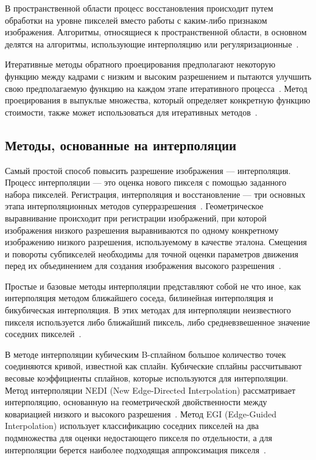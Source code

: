 \documentclass{bmstu}
\begin{document}
В пространственной области процесс восстановления происходит путем обработки на уровне пикселей вместо работы с каким-либо признаком изображения. 
Алгоритмы, относящиеся к пространственной области, в основном делятся на алгоритмы, использующие интерполяцию или регуляризационные~\cite{Daithankar2021}.

Итеративные методы обратного проецирования предполагают некоторую функцию между кадрами с низким и высоким разрешением и пытаются улучшить свою предполагаемую функцию на каждом этапе итеративного процесса~\cite{Cohen2000}. 
Метод проецирования в выпуклые множества, который определяет конкретную функцию стоимости, также может использоваться для итеративных методов~\cite{Katsaggelos1997}.

\subsection{Методы, основанные на интерполяции}

Самый простой способ повысить разрешение изображения --- интерполяция. 
Процесс интерполяции --- это оценка нового пикселя с помощью заданного набора пикселей. 
Регистрация, интерполяция и восстановление --- три основных этапа интерполяционных методов суперразрешения~\cite{Thapa2016}. 
Геометрическое выравнивание происходит при регистрации изображений, при которой изображения низкого разрешения выравниваются по одному конкретному изображению низкого разрешения, используемому в качестве эталона. 
Смещения и повороты субпикселей необходимы для точной оценки параметров движения перед их объединением для создания изображения высокого разрешения~\cite{Daithankar2021}.

Простые и базовые методы интерполяции представляют собой не что иное, как интерполяция методом ближайшего соседа, билинейная интерполяция и бикубическая интерполяция. 
В этих методах для интерполяции неизвестного пикселя используется либо ближайший пиксель, либо средневзвешенное значение соседних пикселей~\cite{Daithankar2021}.

В методе интерполяции кубическим B-сплайном большое количество точек соединяются кривой, известной как сплайн. 
Кубические сплайны рассчитывают весовые коэффициенты сплайнов, которые используются для интерполяции. 
Метод интерполяции NEDI (New Edge-Directed Interpolation) рассматривает интерполяцию, основанную на геометрической двойственности между ковариацией низкого и высокого разрешения~\cite{Daithankar2021}. 
Метод EGI (Edge-Guided Interpolation) использует классификацию соседних пикселей на два подмножества для оценки недостающего пикселя по отдельности, а для интерполяции берется наиболее подходящая аппроксимация пикселя~\cite{Zhang2006}.
\end{document}
